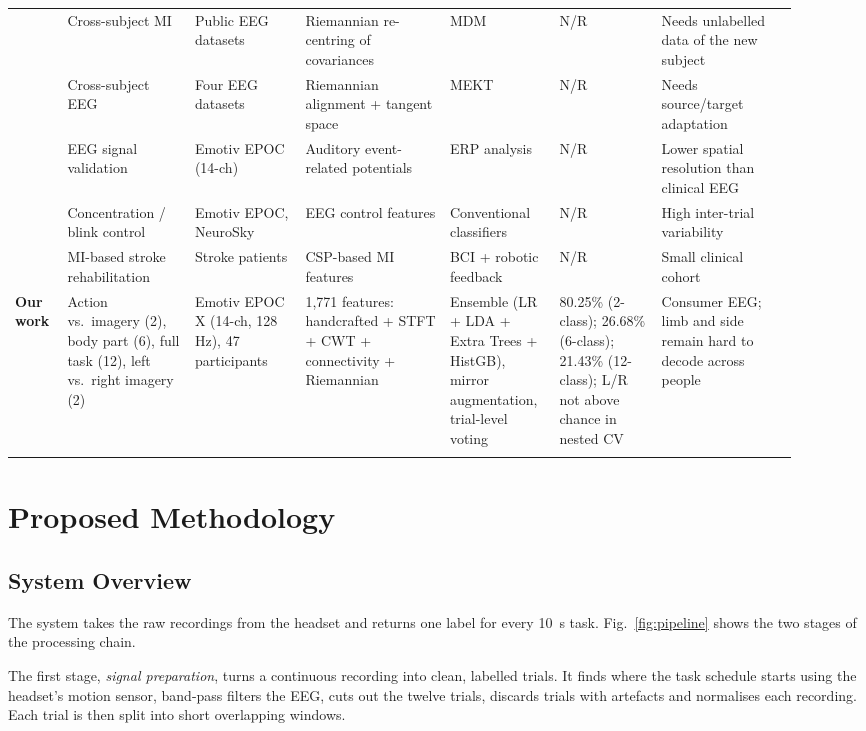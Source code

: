 \documentclass[pdflatex,sn-mathphys-num]{sn-jnl}%
\theoremstyle{thmstyleone}%
\theoremstyle{thmstyletwo}%
\theoremstyle{thmstylethree}%
\begin{document}
\begin{table}[t]
\begin{tabular}{@{}p{0.06\linewidth}p{0.15\linewidth}p{0.13\linewidth}p{0.17\linewidth}p{0.12\linewidth}p{0.12\linewidth}p{0.16\linewidth}@{}}
\cite{Zanini2018} & Cross-subject MI & Public EEG datasets & Riemannian re-centring of covariances & MDM & N/R & Needs unlabelled data of the new subject \\ \addlinespace
\cite{Zhang2020} & Cross-subject EEG & Four EEG datasets & Riemannian alignment + tangent space & MEKT & N/R & Needs source/target adaptation \\ \addlinespace
\cite{Badcock2013} & EEG signal validation & Emotiv EPOC (14-ch) & Auditory event-related potentials & ERP analysis & N/R & Lower spatial resolution than clinical EEG \\ \addlinespace
\cite{Maskeliunas2016} & Concentration / blink control & Emotiv EPOC, NeuroSky & EEG control features & Conventional classifiers & N/R & High inter-trial variability \\ \addlinespace
\cite{Ang2015} & MI-based stroke rehabilitation & Stroke patients & CSP-based MI features & BCI + robotic feedback & N/R & Small clinical cohort \\ \addlinespace
\textbf{Our work} & Action vs.\ imagery (2), body part (6), full task (12), left vs.\ right imagery (2) & Emotiv EPOC X (14-ch, 128 Hz), 47 participants & 1,771 features: handcrafted + STFT + CWT + connectivity + Riemannian & Ensemble (LR + LDA + Extra Trees + HistGB), mirror augmentation, trial-level voting & 80.25\% (2-class); 26.68\% (6-class); 21.43\% (12-class); L/R not above chance in nested CV & Consumer EEG; limb and side remain hard to decode across people \\
\botrule
\end{tabular}
\end{table}
\FloatBarrier

\section{Proposed Methodology}\label{sec:methods}

\subsection{System Overview}\label{subsec:overview}

The system takes the raw recordings from the headset and returns one label for every 10~s task. Fig.~\ref{fig:pipeline} shows the two stages of the processing chain.

The first stage, \emph{signal preparation}, turns a continuous recording into clean, labelled trials. It finds where the task schedule starts using the headset's motion sensor, band-pass filters the EEG, cuts out the twelve trials, discards trials with artefacts and normalises each recording. Each trial is then split into short overlapping windows.
\end{document}
